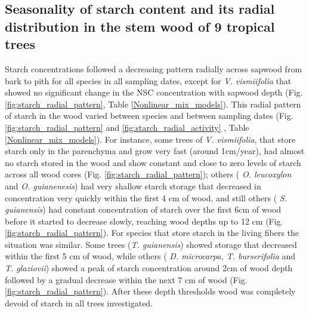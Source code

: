 \documentclass{article}
\begin{document}
\subsection{Seasonality of starch content and its radial distribution in the stem wood of 9 tropical trees}

Starch concentrations followed a decreasing pattern radially across sapwood from bark to pith for all species in all sampling dates, except for \textit{V. vismiifolia} that showed no significant change in the NSC concentration with sapwood depth (Fig. \ref{fig:starch_radial_pattern}, Table \ref{Nonlinear_mix_models}). This radial pattern of starch in the wood varied between species and between sampling dates (Fig. \ref{fig:starch_radial_pattern} and  \ref{fig:starch_radial_activity} , Table \ref{Nonlinear_mix_models}). For instance, some trees of \textit{V. vismiifolia}, that store starch only in the parenchyma and grow very fast (around 1cm/year), had almost no starch stored in the wood and show constant and close to zero levels of starch across all wood cores (Fig. \ref{fig:starch_radial_pattern}); others ( \textit{O. leucoxylon} and \textit{O. guianenesis}) had very shallow starch storage that decreased in concentration very quickly within the first 4 cm of wood, and still others ( \textit{S. guianensis}) had constant concentration of starch over the first 6cm of wood before it started to decrease slowly, reaching wood depths up to 12 cm (Fig. \ref{fig:starch_radial_pattern}). For species that store starch in the living fibers the situation was similar. Some trees (\textit{T. guianensis}) showed storage that decreased within the first 5 cm of wood, while others ( \textit{D. microcarpa, T. burserifolia} and \textit{T. glaziovii}) showed a peak of starch concentration around 2cm of wood depth followed by a gradual decrease within the next 7 cm of wood (Fig. \ref{fig:starch_radial_pattern}). After these depth thresholds wood was completely devoid of starch in all trees investigated.
\end{document}
